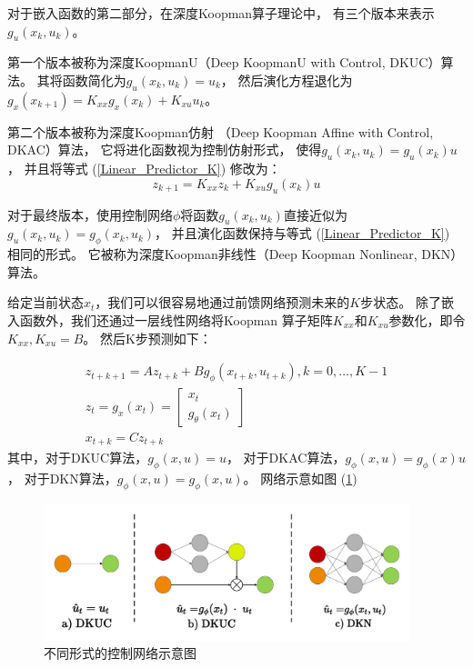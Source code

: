 \documentclass[AutoFakeBold]{LZUThesis}
\begin{document}
对于嵌入函数的第二部分，在深度Koopman算子理论中，
有三个版本来表示$g_u(x_k, u_k)$。

第一个版本被称为深度KoopmanU（Deep KoopmanU with Control, DKUC）算法。
其将函数简化为$g_u(x_k, u_k) = u_k$，
然后演化方程退化为$g_x(x_{k + 1}) = K_{x x} g_x(x_k) + K_{xu} u_k$。

第二个版本被称为深度Koopman仿射
（Deep Koopman Affine with Control, DKAC）算法，
它将进化函数视为控制仿射形式，
使得$g_u(x_k, u_k) = g_u(x_k)u$，
并且将等式 (\ref{Linear_Predictor_K}) 修改为：
\begin{equation}
  z_{k + 1} = K_{x x} z_k + K_{x u} g_u(x_k) u
\end{equation}

对于最终版本，使用控制网络$\phi$将函数$g_u(x_k, u_k)$直接近似为
$g_u(x_k, u_k)=g_{\phi}(x_k, u_k)$，
并且演化函数保持与等式 (\ref{Linear_Predictor_K}) 相同的形式。
它被称为深度Koopman非线性（Deep Koopman Nonlinear, DKN）算法。

给定当前状态$x_t$，我们可以很容易地通过前馈网络预测未来的$K$步状态。
除了嵌入函数外，我们还通过一层线性网络将Koopman
算子矩阵$K_{x x}$和$K_{x u}$参数化，即令$K_{x x}, K_{x u} = B$。
然后K步预测如下：

\begin{equation}
  \begin{array}{c}
    z_{t+k+1}=A z_{t+k}+B g_{\phi}\left(x_{t+k}, u_{t+k}\right), k=0, \ldots, K-1 \\
    z_{t}=g_{x}\left(x_{t}\right)=\left[\begin{array}{c}
    x_{t} \\
    g_{\theta}\left(x_{t}\right)
    \end{array}\right] \\
    x_{t+k}=C z_{t+k}
  \end{array}
  \label{K-steps}
\end{equation}
其中，对于DKUC算法，$g_\phi(x, u)=u$，
对于DKAC算法，$g_\phi(x, u)=g_\phi(x)u$，
对于DKN算法，$g_\phi(x, u)= g_\phi(x, u)$。
网络示意如图 (\ref{control_net})
\begin{figure}
  \centering
  \includegraphics[width=0.95\textwidth]{figures/control_net.pdf}
  \caption{不同形式的控制网络示意图}
  \label{control_net}
\end{figure}
\end{document}
